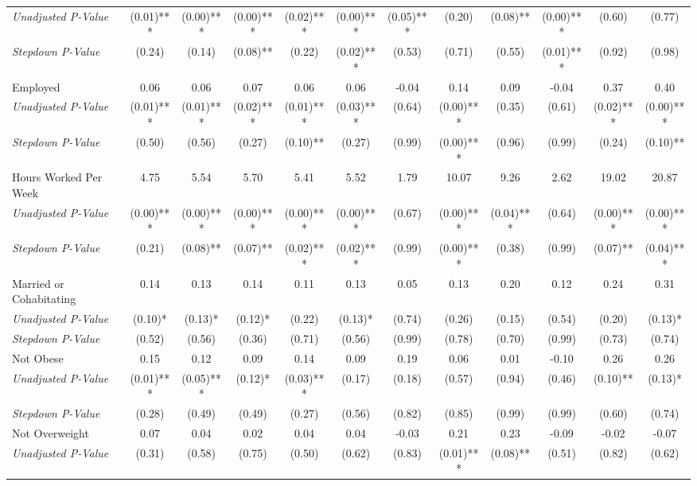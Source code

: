 \begin{tabular}{l c c c c c c c c c c c}
\quad \textit{Unadjusted P-Value} & (0.01)*** & (0.00)*** & (0.00)*** & (0.02)*** & (0.00)*** & (0.05)*** & (0.20) & (0.08)** & (0.00)*** & (0.60) & (0.77) \\
\quad \textit{Stepdown P-Value} & (0.24) & (0.14) & (0.08)** & (0.22) & (0.02)*** & (0.53) & (0.71) & (0.55) & (0.01)*** & (0.92) & (0.98) \\
Employed & 0.06 & 0.06 & 0.07 & 0.06 & 0.06 & -0.04 & 0.14 & 0.09 & -0.04 & 0.37 & 0.40 \\
\quad \textit{Unadjusted P-Value} & (0.01)*** & (0.01)*** & (0.02)*** & (0.01)*** & (0.03)*** & (0.64) & (0.00)*** & (0.35) & (0.61) & (0.02)*** & (0.00)*** \\
\quad \textit{Stepdown P-Value} & (0.50) & (0.56) & (0.27) & (0.10)** & (0.27) & (0.99) & (0.00)*** & (0.96) & (0.99) & (0.24) & (0.10)** \\
Hours Worked Per Week & 4.75 & 5.54 & 5.70 & 5.41 & 5.52 & 1.79 & 10.07 & 9.26 & 2.62 & 19.02 & 20.87 \\
\quad \textit{Unadjusted P-Value} & (0.00)*** & (0.00)*** & (0.00)*** & (0.00)*** & (0.00)*** & (0.67) & (0.00)*** & (0.04)*** & (0.64) & (0.00)*** & (0.00)*** \\
\quad \textit{Stepdown P-Value} & (0.21) & (0.08)** & (0.07)** & (0.02)*** & (0.02)*** & (0.99) & (0.00)*** & (0.38) & (0.99) & (0.07)** & (0.04)*** \\
Married or Cohabitating & 0.14 & 0.13 & 0.14 & 0.11 & 0.13 & 0.05 & 0.13 & 0.20 & 0.12 & 0.24 & 0.31 \\
\quad \textit{Unadjusted P-Value} & (0.10)* & (0.13)* & (0.12)* & (0.22) & (0.13)* & (0.74) & (0.26) & (0.15) & (0.54) & (0.20) & (0.13)* \\
\quad \textit{Stepdown P-Value} & (0.52) & (0.56) & (0.36) & (0.71) & (0.56) & (0.99) & (0.78) & (0.70) & (0.99) & (0.73) & (0.74) \\
Not Obese & 0.15 & 0.12 & 0.09 & 0.14 & 0.09 & 0.19 & 0.06 & 0.01 & -0.10 & 0.26 & 0.26 \\
\quad \textit{Unadjusted P-Value} & (0.01)*** & (0.05)*** & (0.12)* & (0.03)*** & (0.17) & (0.18) & (0.57) & (0.94) & (0.46) & (0.10)** & (0.13)* \\
\quad \textit{Stepdown P-Value} & (0.28) & (0.49) & (0.49) & (0.27) & (0.56) & (0.82) & (0.85) & (0.99) & (0.99) & (0.60) & (0.74) \\
Not Overweight & 0.07 & 0.04 & 0.02 & 0.04 & 0.04 & -0.03 & 0.21 & 0.23 & -0.09 & -0.02 & -0.07 \\
\quad \textit{Unadjusted P-Value} & (0.31) & (0.58) & (0.75) & (0.50) & (0.62) & (0.83) & (0.01)*** & (0.08)** & (0.51) & (0.82) & (0.62) \\

\end{tabular}
